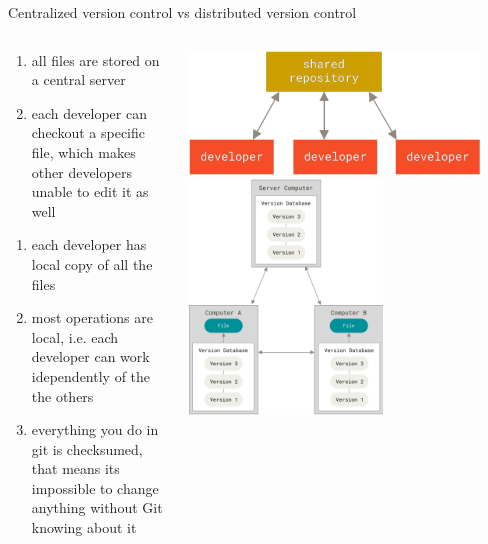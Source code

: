 \documentclass{beamer}
\begin{document}
\begin{frame}[fragile,t]{Centralized version control vs distributed version control}
  \begin{columns}
    \begin{column}{0.5\textwidth}
      \begin{enumerate}
        \item all files are stored on a central server
        \item each developer can checkout a specific file, which makes other developers unable to edit it as well
      \end{enumerate}\vspace{10pt}

      \begin{enumerate}
        \item each developer has local copy of all the files
        \item most operations are local, i.e. each developer can work idependently of the the others
        \item everything you do in git is checksumed, that means its impossible to change anything without Git knowing about it
      \end{enumerate}

    \end{column}
    \begin{column}{0.5\textwidth}
      \includegraphics[width=0.9\textwidth,height=0.3\textheight]{screenshots/2022-03-27-110945_985x420_scrot.png}
      \centering
      \includegraphics[width=0.6\textwidth,height=0.6\textheight]{screenshots/2022-03-27-111452_498x606_scrot.png}
    \end{column}
  \end{columns}
\end{frame}
\end{document}
